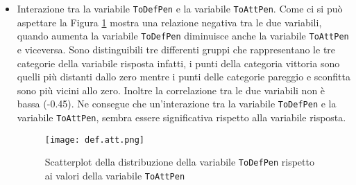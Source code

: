\begin{itemize}
\item Interazione tra la variabile \texttt{ToDefPen} e la variabile \texttt{ToAttPen}. Come ci si può aspettare la Figura \ref{fig:defatt} mostra una relazione negativa tra le due variabili, quando aumenta la variabile \texttt{ToDefPen} diminuisce anche la variabile \texttt{ToAttPen} e viceversa. Sono distinguibili tre differenti gruppi che rappresentano le tre categorie della variabile risposta infatti, i punti della categoria vittoria sono quelli più distanti dallo zero mentre i punti delle categorie pareggio e sconfitta sono più vicini allo zero. Inoltre la correlazione tra le due variabili non è bassa (-0.45). Ne consegue che un'interazione tra la variabile \texttt{ToDefPen} e la variabile \texttt{ToAttPen}, sembra essere significativa rispetto alla variabile risposta.

\begin{figure}[htbp]
	\begin{center}
		\texttt{[image: def.att.png]}
		\caption{Scatterplot della distribuzione della variabile \texttt{ToDefPen} rispetto ai valori della variabile \texttt{ToAttPen}}  \label{fig:defatt}
	\end{center}
\end{figure}

\end{itemize}

